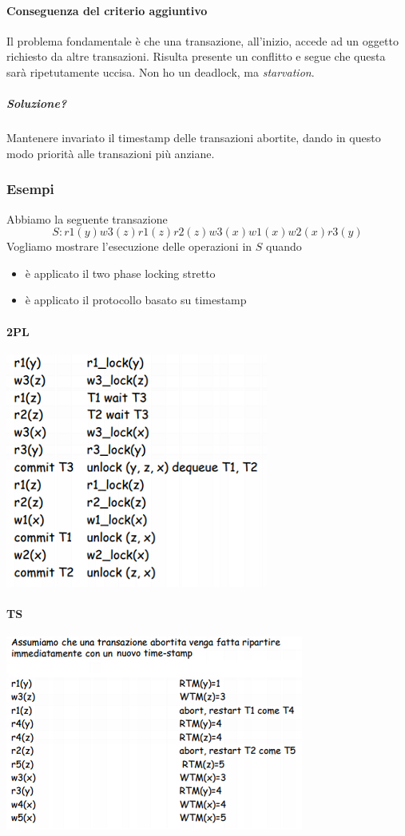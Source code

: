 \paragraph{Conseguenza del criterio aggiuntivo} Il problema fondamentale è che una transazione, all'inizio, accede ad un oggetto richiesto da altre transazioni. Risulta presente un conflitto e segue che questa sarà ripetutamente uccisa. Non ho un deadlock, ma \emph{starvation}.
\subparagraph{Soluzione?} Mantenere invariato il timestamp delle transazioni abortite, dando in questo modo priorità alle transazioni più anziane.
\subsubsection{Esempi}
Abbiamo la seguente transazione
\[S: r1(y)w3(z)r1(z)r2(z)w3(x)w1(x)w2(x)r3(y)\]
Vogliamo mostrare l'esecuzione delle operazioni in $S$ quando
\begin{itemize}
	\item è applicato il two phase locking stretto
	\item è applicato il protocollo basato su timestamp
\end{itemize}
\begin{multicols}{2}
	\paragraph{2PL}
	\begin{center}\includegraphics{images/172.PNG}\end{center}
	\paragraph{TS}
	\begin{center}\includegraphics{images/173.PNG}\end{center}
\end{multicols}
\pagebreak

